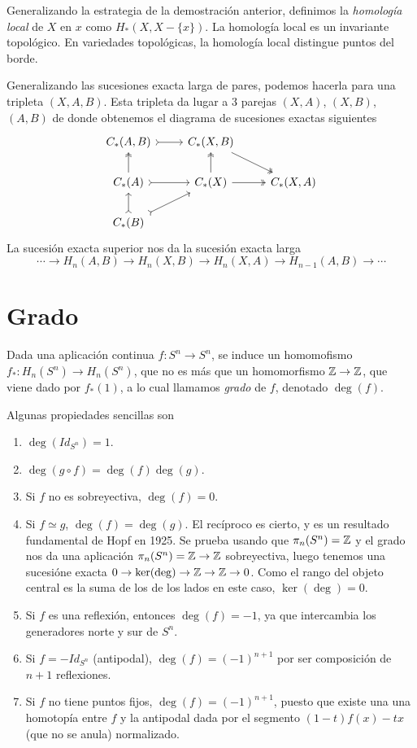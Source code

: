 \documentclass[TA.tex]{subfiles}
\begin{document}
Generalizando la estrategia de la demostración anterior, definimos la \emph{homología local} de $X$ en $x$ como $H_*(X, X-\{x\})$. La homología local es un invariante topológico. En variedades topológicas, la homología local distingue puntos del borde.


Generalizando las sucesiones exacta larga de pares, podemos hacerla para una tripleta $(X,A,B)$. Esta tripleta da lugar a 3 parejas $(X,A)$, $(X,B)$, $(A,B)$ de donde obtenemos el diagrama de sucesiones exactas siguientes
\[
\begin{tikzcd}
C_*(A,B)\arrow[r, rightarrowtail] & C_*(X,B)\arrow[dr, twoheadrightarrow]&\\
C_*(A)\arrow[r, rightarrowtail] \arrow[u,twoheadrightarrow] & C_*(X)\arrow[r, twoheadrightarrow] \arrow[u,twoheadrightarrow]& C_*(X,A)\\
C_*(B)\arrow[u, rightarrowtail]\arrow[ur, rightarrowtail]& & 
\end{tikzcd}
\]
La sucesión exacta superior nos da la sucesión exacta larga
\[
\cdots\to H_n(A,B)\to H_n(X,B)\to H_n(X,A)\to H_{n-1}(A,B)\to\cdots
\]


\section{Grado}
Dada una aplicación continua $f:S^n\to S^n$, se induce un homomofismo $f_*:H_n(S^n)\to H_n(S^n)$, que no es más que un homomorfismo $\mathbb{Z}\to\mathbb{Z}$, que viene dado por $f_*(1)$, a lo cual llamamos \emph{grado} de $f$, denotado $\deg(f)$. 
\begin{propi}
Algunas propiedades sencillas son
\begin{enumerate}
\item $\deg(Id_{S^n})=1$.
\item $\deg(g\circ f)=\deg(f)\deg(g)$.
\item Si $f$ no es sobreyectiva, $\deg(f)=0$. 
\item Si $f\simeq g$, $\deg(f)=\deg(g)$. El recíproco es cierto, y es un resultado fundamental de Hopf en 1925. Se prueba usando que $\pi_n(S^n)=\mathbb{Z}$ y el grado nos da una aplicación $\pi_n(S^n)=\mathbb{Z}\to\mathbb{Z}$ sobreyectiva, luego tenemos una sucesióne exacta $0\to\ker(\deg)\to \mathbb{Z}\to\mathbb{Z}\to 0$. Como el rango del objeto central es la suma de los de los lados en este caso, $\ker(\deg)=0$. 
\item Si $f$ es una reflexión, entonces $\deg(f)=-1$, ya que intercambia los generadores norte y sur de $S^n$. 
\item Si $f=-Id_{S^n}$ (antipodal), $\deg(f)=(-1)^{n+1}$ por ser composición de $n+1$ reflexiones.
\item Si $f$ no tiene puntos fijos, $\deg(f)=(-1)^{n+1}$, puesto que existe una una homotopía entre $f$ y la antipodal dada por el segmento $(1-t)f(x)-tx$ (que no se anula) normalizado. 
\end{enumerate}
\end{propi}
\end{document}
